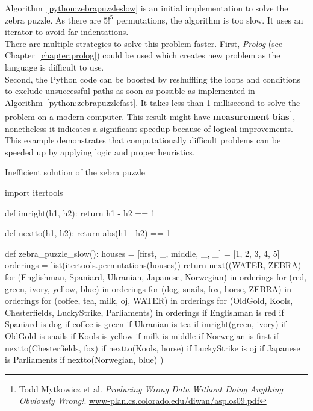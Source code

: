 \documentclass{report}
\begin{document}
Algorithm~\ref{python:zebrapuzzleslow} is an initial implementation to solve the zebra puzzle. As there are $5!^5$ permutations, the algorithm is too slow. It uses an iterator to avoid far indentations.
\\
There are multiple strategies to solve this problem faster. First, {\em Prolog} (see Chapter~\ref{chapter:prolog}) could be used which creates new problem as the language is difficult to use.
\\
Second, the Python code can be boosted by reshuffling the loops and conditions to exclude unsuccessful paths as soon as possible as implemented in Algorithm~\ref{python:zebrapuzzlefast}.
It takes less than 1 millisecond to solve the problem on a modern computer.
This result might have {\bf measurement bias}\footnote{Todd Mytkowicz et al. {\em Producing Wrong Data Without Doing Anything Obviously Wrong!}. \url{www-plan.cs.colorado.edu/diwan/asplos09.pdf}}, nonetheless it indicates a significant speedup because of logical improvements.
\\
This example demonstrates that computationally difficult problems can be speeded up by applying logic and proper heuristics.

\begin{algorithm}
\caption{Inefficient solution of the zebra puzzle}
\label{python:zebrapuzzleslow}
\begin{python}
import itertools

def imright(h1, h2): return h1 - h2  == 1

def nextto(h1, h2): return abs(h1 - h2) == 1

def zebra_puzzle_slow():
    houses = [first, _, middle, _, _] = [1, 2, 3, 4, 5]
    orderings = list(itertools.permutations(houses))
    return next((WATER, ZEBRA)
                for (Englishman, Spaniard, Ukranian,
                        Japanese, Norwegian) in orderings
                for (red, green, ivory, yellow, blue) in orderings
                for (dog, snails, fox, horse, ZEBRA) in orderings
                for (coffee, tea, milk, oj, WATER) in orderings
                for (OldGold, Kools, Chesterfields, LuckyStrike,
                        Parliaments) in orderings
                if Englishman is red
                if Spaniard is dog
                if coffee is green
                if Ukranian is tea
                if imright(green, ivory)
                if OldGold is snails
                if Kools is yellow
                if milk is middle
                if Norwegian is first
                if nextto(Chesterfields, fox)
                if nextto(Kools, horse)
                if LuckyStrike is oj
                if Japanese is Parliaments
                if nextto(Norwegian, blue)
                )
\end{python}
\end{algorithm}
\end{document}
